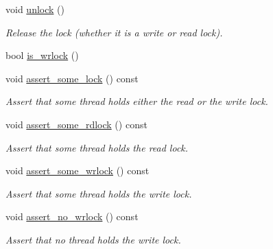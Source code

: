 \begin{DoxyCompactItemize}
\mbox{\label{classCheckable__rwlock_ad2eb6c44afcc5d29561c39312764235b}} 
void \mbox{\hyperlink{classCheckable__rwlock_ad2eb6c44afcc5d29561c39312764235b}{unlock}} ()
\begin{DoxyCompactList}\small\item\em Release the lock (whether it is a write or read lock). \end{DoxyCompactList}\item 
bool \mbox{\hyperlink{classCheckable__rwlock_ae0c50e01a86f053d4bc6f6a3d12fa8d6}{is\+\_\+wrlock}} ()
\item 
\mbox{\label{classCheckable__rwlock_ab1aad868b6bf06731bd2b11cee4c93f8}} 
void \mbox{\hyperlink{classCheckable__rwlock_ab1aad868b6bf06731bd2b11cee4c93f8}{assert\+\_\+some\+\_\+lock}} () const
\begin{DoxyCompactList}\small\item\em Assert that some thread holds either the read or the write lock. \end{DoxyCompactList}\item 
\mbox{\label{classCheckable__rwlock_acb0373759eb686e4d19a23512db6b02b}} 
void \mbox{\hyperlink{classCheckable__rwlock_acb0373759eb686e4d19a23512db6b02b}{assert\+\_\+some\+\_\+rdlock}} () const
\begin{DoxyCompactList}\small\item\em Assert that some thread holds the read lock. \end{DoxyCompactList}\item 
\mbox{\label{classCheckable__rwlock_aeb9400863a78a87ea77b111f04f6958b}} 
void \mbox{\hyperlink{classCheckable__rwlock_aeb9400863a78a87ea77b111f04f6958b}{assert\+\_\+some\+\_\+wrlock}} () const
\begin{DoxyCompactList}\small\item\em Assert that some thread holds the write lock. \end{DoxyCompactList}\item 
\mbox{\label{classCheckable__rwlock_a80e2658d8efb9c9b5fb8543f19e17ad5}} 
void \mbox{\hyperlink{classCheckable__rwlock_a80e2658d8efb9c9b5fb8543f19e17ad5}{assert\+\_\+no\+\_\+wrlock}} () const
\begin{DoxyCompactList}\small\item\em Assert that no thread holds the write lock. \end{DoxyCompactList}\item 

\end{DoxyCompactItemize}
